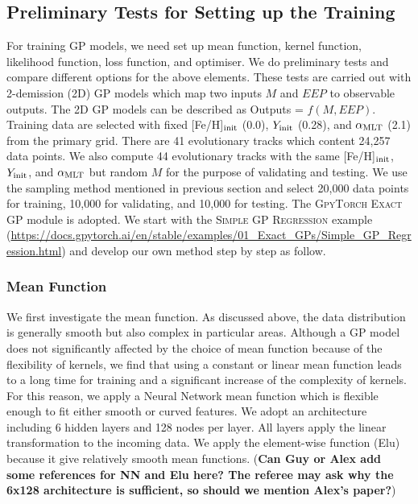 \subsection{Preliminary Tests for Setting up the Training}

For training GP models, we need set up mean function, kernel function, likelihood function, loss function, and optimiser. 
We do preliminary tests and compare different options for the above elements. 
%
These tests are carried out with 2-demission (2D) GP models which map two inputs $M$ and $EEP$ to observable outputs. The 2D GP models can be described as Outputs = $f(M, EEP)$. 
%
Training data are selected with fixed [Fe/H]$_{\rm init}$ (0.0), $Y_{\rm init}$ (0.28), and $\alpha_{\rm MLT}$ (2.1) from the primary grid. There are 41 evolutionary tracks which content 24,257 data points. We also compute 44 evolutionary tracks with the same [Fe/H]$_{\rm init}$, $Y_{\rm init}$, and $\alpha_{\rm MLT}$ but random $M$ for the purpose of validating and testing. We use the sampling method mentioned in previous section and select 20,000 data points for training, 10,000 for validating, and 10,000 for testing. 
%
The \textsc{GpyTorch Exact GP} module is adopted. We start with the \textsc{Simple GP Regression} example (\url{https://docs.gpytorch.ai/en/stable/examples/01_Exact_GPs/Simple_GP_Regression.html}) and develop our own method step by step as follow. 

\subsubsection{Mean Function}

We first investigate the mean function. As discussed above, the data distribution is generally smooth but also complex in particular areas. Although a GP model does not significantly affected by the choice of mean function because of the flexibility of kernels, we find that using a constant or linear mean function leads to a long time for training and a significant increase of the complexity of kernels. For this reason, we apply a Neural Network mean function which is flexible enough to fit either smooth or curved features. We adopt an architecture including 6 hidden layers and 128 nodes per layer. All layers apply the linear transformation to the incoming data. We apply the element-wise function (Elu) because it give relatively smooth mean functions. ({\bf Can Guy or Alex add some references for NN and Elu here? The referee may ask why the 6x128 architecture is sufficient, so should we mention Alex's paper?})

